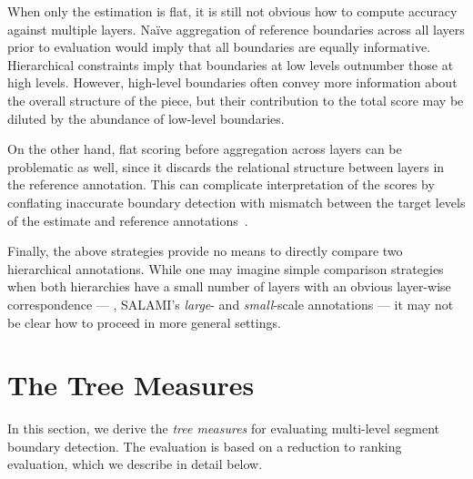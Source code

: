 \documentclass{article}
\begin{document}
When only the estimation is flat, it is still not obvious how to compute accuracy against multiple layers.
Na\"ive aggregation of reference boundaries across all layers prior to evaluation would imply 
that all boundaries are equally informative.
Hierarchical constraints imply that boundaries at low levels outnumber those at high levels.
However, high-level boundaries often convey more information about the overall structure of the piece, but
their contribution to the total score may be diluted by the abundance of low-level boundaries.

On the other hand, flat scoring before aggregation across layers can be problematic as well, 
since it discards the relational structure between layers in the reference annotation.
This can complicate interpretation of the scores by conflating inaccurate boundary detection
with mismatch between the target levels of the estimate and reference annotations~\cite{Smith2013}.

Finally, the above strategies provide no means to directly compare two hierarchical annotations.
While one may imagine simple comparison strategies when both hierarchies have a small
number of layers with an obvious layer-wise correspondence 
--- \eg, SALAMI's \emph{large}- and \emph{small}-scale annotations --- it may not be clear how to proceed in
more general settings.



\section{The Tree Measures}\label{sec:eval_desc}
\sloppy
In this section, we derive the \emph{tree measures} for evaluating multi-level segment boundary detection.
The evaluation is based on a reduction to ranking evaluation, which we describe in detail below.
\end{document}
